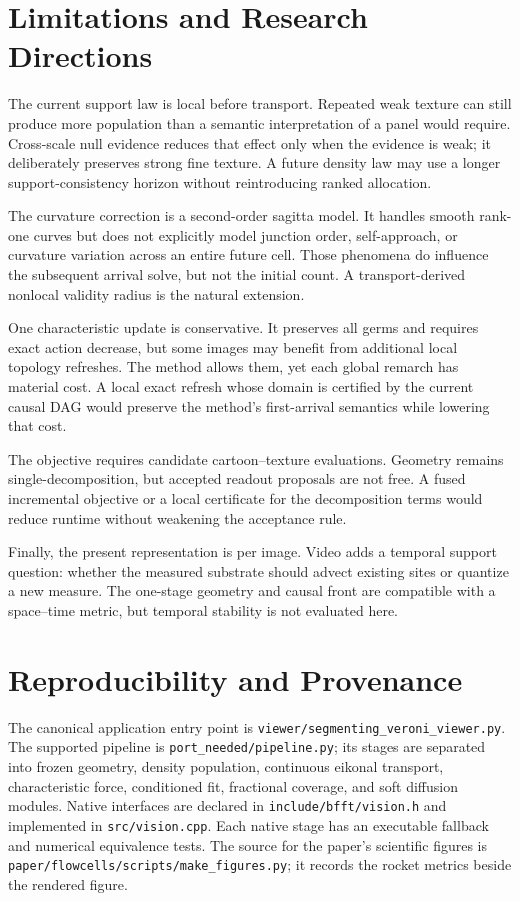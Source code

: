 \documentclass[11pt,letterpaper]{article}
\begin{document}
\section{Limitations and Research Directions}
\label{sec:limitations}

The current support law is local before transport. Repeated weak texture can still
produce more population than a semantic interpretation of a panel would require.
Cross-scale null evidence reduces that effect only when the evidence is weak; it
deliberately preserves strong fine texture. A future density law may use a longer
support-consistency horizon without reintroducing ranked allocation.

The curvature correction is a second-order sagitta model. It handles smooth rank-one
curves but does not explicitly model junction order, self-approach, or curvature
variation across an entire future cell. Those phenomena do influence the subsequent
arrival solve, but not the initial count. A transport-derived nonlocal validity radius
is the natural extension.

One characteristic update is conservative. It preserves all germs and requires exact
action decrease, but some images may benefit from additional local topology refreshes.
The method allows them, yet each global remarch has material cost. A local exact refresh
whose domain is certified by the current causal DAG would preserve the method's
first-arrival semantics while lowering that cost.

The objective requires candidate cartoon--texture evaluations. Geometry remains
single-decomposition, but accepted readout proposals are not free. A fused incremental
objective or a local certificate for the decomposition terms would reduce runtime
without weakening the acceptance rule.

Finally, the present representation is per image. Video adds a temporal support
question: whether the measured substrate should advect existing sites or quantize a
new measure. The one-stage geometry and causal front are compatible with a
space--time metric, but temporal stability is not evaluated here.

\section{Reproducibility and Provenance}
\label{sec:reproducibility}

The canonical application entry point is
\texttt{viewer/segmenting\_veroni\_viewer.py}. The supported pipeline is
\texttt{port\_needed/pipeline.py}; its stages are separated into frozen geometry,
density population, continuous eikonal transport, characteristic force, conditioned
fit, fractional coverage, and soft diffusion modules. Native interfaces are declared
in \texttt{include/bfft/vision.h} and implemented in \texttt{src/vision.cpp}. Each
native stage has an executable fallback and numerical equivalence tests. The source for
the paper's scientific figures is
\texttt{paper/flowcells/scripts/make\_figures.py}; it records the rocket metrics beside
the rendered figure.
\end{document}
